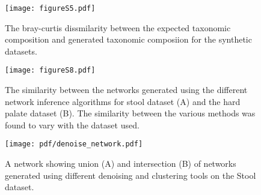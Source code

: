   \begin{figure}[h]
    \centering
    \texttt{[image: figureS5.pdf]}
    \caption{
      The bray-curtis dissmilarity between the expected taxonomic composition and generated taxonomic composiion for the synthetic datasets.
  }
  \label{fig:figureS5}
  \end{figure}


  \begin{figure}[h]
    \centering
    \texttt{[image: figureS8.pdf]}
    \caption{
      The similarity between the networks generated using the different network inference algorithms for stool dataset (A) and the hard palate dataset (B).
      The similarity between the various methods was found to vary with the dataset used.
  }
    \label{fig:figureS8}
  \end{figure}

  \begin{figure}[h]
    \centering
    \texttt{[image: pdf/denoise\_network.pdf]}
    \caption{A network showing union (A) and intersection (B) of networks generated using different denoising and clustering tools on the Stool dataset.}
    \label{fig:figureS5}
  \end{figure}
